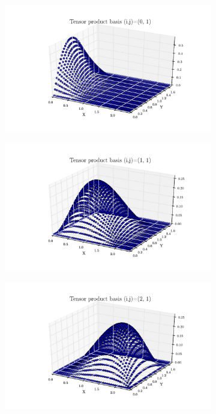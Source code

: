 \documentclass[11pt,letterpaper]{article}
\begin{document}
  \begin{figure}[!tbh]
  \begin{subfigure}[b]{.6\textwidth}
    \includegraphics[width=\textwidth]{problem_2_2_0_1.pdf}
    \caption{}
    \label{fig3:label:a}
  \end{subfigure}
  \hfill
  \begin{subfigure}[b]{.6\textwidth}
    \includegraphics[width=\textwidth]{problem_2_2_1_1.pdf}
    \caption{}
    \label{fig3:label:b}
  \end{subfigure}
  \hfill
    \begin{subfigure}[b]{.6\textwidth}
    \includegraphics[width=\textwidth]{problem_2_2_2_1.pdf}

\end{subfigure}
\end{figure}
\end{document}
